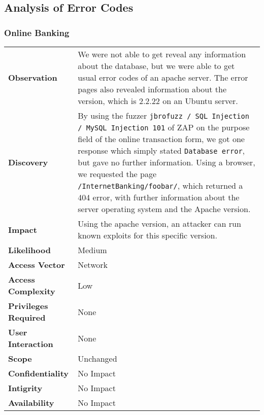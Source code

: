 \subsection{Analysis of Error Codes}
\subsubsection*{Online Banking}
\begin{tabular}{l|p{10cm}}

\textbf{Observation} & We were not able to get reveal any information about the database, but we were able to get usual error codes of an apache server. The error pages also revealed information about the version, which is 2.2.22 on an Ubuntu server. \\
\textbf{Discovery} & By using the fuzzer \texttt{jbrofuzz / SQL Injection / MySQL Injection 101} of ZAP on the purpose field of the online transaction form, we got one response which simply stated \texttt{Database error}, but gave no further information. Using a browser, we requested the page \texttt{/InternetBanking/foobar/}, which returned a 404 error, with further information about the server operating system and the Apache version. \\
\textbf{Impact} & Using the apache version, an attacker can run known exploits for this specific version. \\
\textbf{Likelihood} & Medium \\
\textbf{Access Vector} & Network \\
\textbf{Access Complexity} & Low \\
\textbf{Privileges Required} & None \\
\textbf{User Interaction} & None \\
\textbf{Scope} & Unchanged \\
\textbf{Confidentiality} & No Impact \\
\textbf{Intigrity} & No Impact \\
\textbf{Availability} & No Impact \\
\end{tabular}


